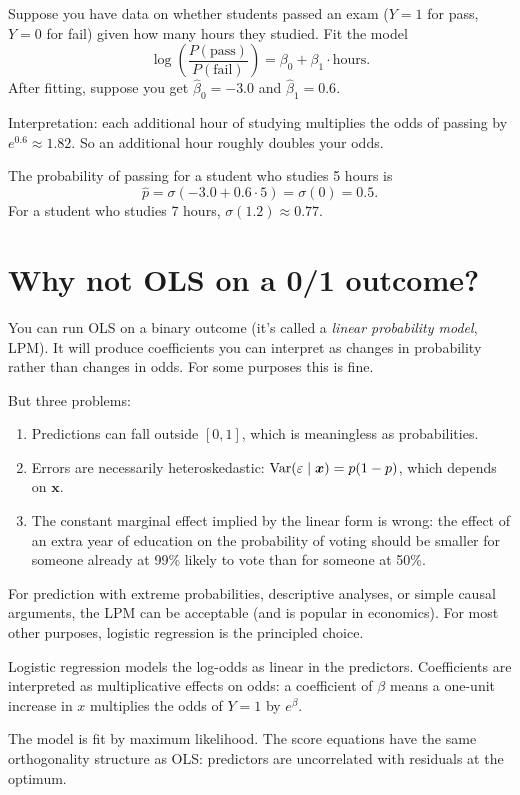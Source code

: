 Suppose you have data on whether students passed an exam ($Y = 1$ for pass, $Y = 0$ for fail) given how many hours they studied. Fit the model
\[
  \log\!\left(\frac{P(\text{pass})}{P(\text{fail})}\right) = \beta_0 + \beta_1 \cdot \text{hours}.
\]
After fitting, suppose you get $\hat\beta_0 = -3.0$ and $\hat\beta_1 = 0.6$.

Interpretation: each additional hour of studying multiplies the odds of passing by $e^{0.6} \approx 1.82$. So an additional hour roughly doubles your odds.

The probability of passing for a student who studies 5 hours is
\[
  \hat p = \sigma(-3.0 + 0.6 \cdot 5) = \sigma(0) = 0.5.
\]
For a student who studies 7 hours, $\sigma(1.2) \approx 0.77$.

\section{Why not OLS on a 0/1 outcome?}

You can run OLS on a binary outcome (it's called a \emph{linear probability model}, LPM). It will produce coefficients you can interpret as changes in probability rather than changes in odds. For some purposes this is fine.

But three problems:
\begin{enumerate}[noitemsep]
\item Predictions can fall outside $[0, 1]$, which is meaningless as probabilities.
\item Errors are necessarily heteroskedastic: $\operatorname{Var}(\varepsilon \mid \bm{x}) = p(1-p)$, which depends on $\bm{x}$.
\item The constant marginal effect implied by the linear form is wrong: the effect of an extra year of education on the probability of voting should be smaller for someone already at 99\% likely to vote than for someone at 50\%.
\end{enumerate}

For prediction with extreme probabilities, descriptive analyses, or simple causal arguments, the LPM can be acceptable (and is popular in economics). For most other purposes, logistic regression is the principled choice.

\begin{keyinsight}
Logistic regression models the log-odds as linear in the predictors. Coefficients are interpreted as multiplicative effects on odds: a coefficient of $\beta$ means a one-unit increase in $x$ multiplies the odds of $Y = 1$ by $e^{\beta}$.

The model is fit by maximum likelihood. The score equations have the same orthogonality structure as OLS: predictors are uncorrelated with residuals at the optimum.
\end{keyinsight}

